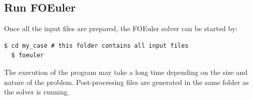 \documentclass[]{article}
\begin{document}
\subsection{Run FOEuler}

Once all the input files are prepared, the FOEuler solver can be started by:
\begin{lstlisting}[backgroundcolor=\color{lightgray}]
  $ cd my_case # this folder contains all input files
  $ foeuler
\end{lstlisting}
The execution of the program may take a long time depending on the size and nature of the problem.
Post-processing files are generated in the same folder as the solver is running.
\end{document}

